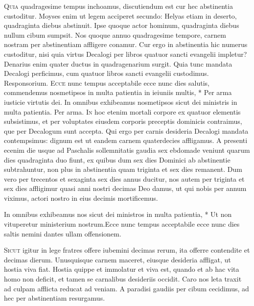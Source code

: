 \begin{multicols*}{2}
\lettrine[lines=2]{\zallmancaps \color{Blue} Q}{uia} quadragesime tempus inchoamus, discutiendum est cur hec abstinentia custoditur. Moyses enim ut legem acciperet secundo: Helyas etiam in deserto, quadraginta diebus abstinuit. Ipse quoque actor hominum, quadraginta diebus nullum cibum sumpsit. Nos quoque annuo quadragesime tempore, carnem nostram per abstinentiam affligere conamur. Cur ergo in abstinentia hic numerus custoditur, nisi quia virtus Decalogi per libros quatuor sancti evangelii impletur? Denarius enim quater ductus in quadragenarium surgit. Quia tunc mandata Decalogi perficimus, cum quatuor libros sancti evangelii custodimus.
{\color{Red} Responsorium.}
\lettrine[lines=2]{\zallmancaps \color{Red} E}{cce} \hypertarget{ecce-nunc}{\label{ecce-nunc}} nunc tempus acceptabile ecce nunc dies salutis, commendemus nosmetipsos in multa patientia in ieiuniis multis, * Per arma iusticie virtutis dei. \V In omnibus exhibeamus nosmetipsos sicut dei ministris in multa patientia. Per arma.
\lettrine[lines=2]{\zallmancaps \color{Blue} I}{n} hoc etenim mortali corpore ex quatuor elementis subsistimus, et per voluptates eiusdem corporis preceptis dominicis contraimus, que per Decalogum sunt accepta. Qui ergo per carnis desideria Decalogi mandata contempsimus: dignum est ut eandem carnem quaterdecies affligamus. A presenti ecenim die usque ad Paschalis sollemnitatis gaudia sex ebdomade veniunt quarum dies quadraginta duo fiunt, ex quibus dum sex dies Dominici ab abstinentie subtrahuntur, non plus
in abstinentia quam triginta et sex dies remanent. Dum vero per trecentos et sexaginta sex dies annus ducitur, nos autem per triginta et sex dies affligimur quasi anni nostri decimas Deo damus, ut qui nobis per annum viximus, actori nostro in eius decimis mortificemus.
\begin{responsory}[in-omnibus]
{In omnibus exhibeamus nos sicut dei ministros in multa patientia, * Ut non vituperetur ministerium nostrum.}{Ecce nunc tempus acceptabile ecce nunc dies saltis nemini dantes ullam offensionem.}
\end{responsory}
\lettrine[lines=2]{\zallmancaps \color{Red} S}{icut} igitur in lege fratres offere iubemini decimas rerum, ita offerre contendite et decimas dierum. Unusquisque carnem maceret, eiusque desideria affligat, ut hostia viva fiat. Hostia quippe et immolatur et viva est, quando et ab hac vita homo non deficit, et tamen se carnalibus desideriis occidit. Caro nos leta traxit ad culpam afflicta reducat ad veniam. A paradisi gaudiis per cibum cecidimus, ad hec per abstinentiam resurgamus.

\end{multicols*}
